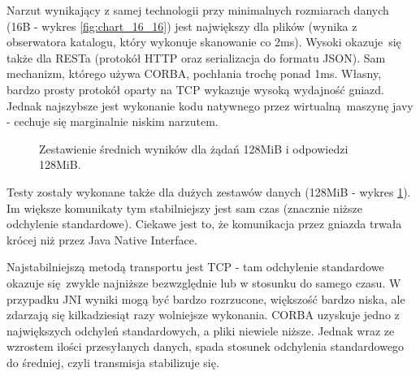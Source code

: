 Narzut wynikający z samej technologii przy minimalnych rozmiarach danych (16B - wykres \ref{fig:chart_16_16}) jest największy dla plików (wynika z obserwatora katalogu, który wykonuje skanowanie co 2ms). Wysoki okazuje się także dla RESTa (protokół HTTP oraz serializacja do formatu JSON). Sam mechanizm, którego używa CORBA, pochłania trochę ponad 1ms. Własny, bardzo prosty protokół oparty na TCP wykazuje wysoką wydajność gniazd. Jednak najszybsze jest wykonanie kodu natywnego przez wirtualną maszynę javy - cechuje się marginalnie niskim narzutem.
 

\begin{figure}[H]
\caption{Zestawienie średnich wyników dla żądań 128MiB i odpowiedzi 128MiB.}
\label{fig:chart_134217728_134217728}
\end{figure}

Testy zostały wykonane także dla dużych zestawów danych (128MiB - wykres \ref{fig:chart_134217728_134217728}). Im większe komunikaty tym stabilniejszy jest sam czas (znacznie niższe odchylenie standardowe). Ciekawe jest to, że komunikacja przez gniazda trwała krócej niż przez Java Native Interface.

Najstabilniejszą metodą transportu jest TCP - tam odchylenie standardowe okazuje się zwykle najniższe bezwzględnie lub w stosunku do samego czasu. W przypadku JNI wyniki mogą być bardzo rozrzucone, większość bardzo niska, ale zdarzają się kilkadziesiąt razy wolniejsze wykonania.
CORBA uzyskuje jedno z największych odchyleń standardowych, a pliki niewiele niższe. Jednak wraz ze wzrostem ilości przesyłanych danych, spada stosunek odchylenia standardowego do średniej, czyli transmisja stabilizuje się.

